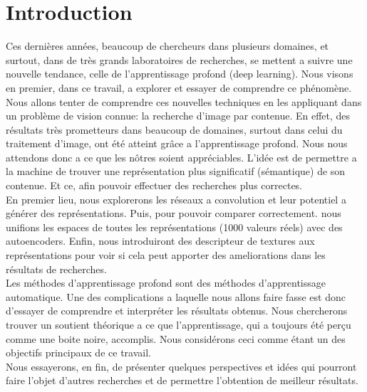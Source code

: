 
\chapter*{Introduction} %

Ces dernières années, beaucoup de chercheurs dans plusieurs domaines, et surtout, dans de très grands laboratoires de recherches, se mettent a suivre une nouvelle tendance, celle de l'apprentissage profond (deep learning). Nous visons en premier, dans ce travail, a explorer et essayer de comprendre ce phénomène.\\

Nous allons tenter de comprendre ces nouvelles techniques en les appliquant dans un problème de vision connue: la recherche d'image par contenue. En effet, des résultats très prometteurs dans beaucoup de domaines, surtout dans celui du traitement d'image, ont été atteint  grâce a l'apprentissage profond. Nous nous attendons donc a ce que les nôtres soient appréciables. L’idée est de permettre a la machine de trouver une représentation plus significatif (sémantique) de son contenue. Et ce, afin pouvoir effectuer des recherches plus correctes.\\

En premier lieu, nous explorerons les réseaux a convolution et leur potentiel a générer des représentations. Puis, pour pouvoir comparer correctement. nous unifions les espaces de toutes les représentations (1000 valeurs réels) avec des autoencoders. Enfin, nous introduiront des descripteur de textures aux représentations pour voir si cela peut apporter des ameliorations dans les résultats de recherches.\\

Les méthodes d’apprentissage profond sont des méthodes d'apprentissage automatique. Une des complications a laquelle nous allons faire fasse est donc d'essayer de comprendre et interpréter les résultats obtenus. Nous chercherons trouver un soutient théorique a ce que l'apprentissage, qui a toujours été perçu comme une boite noire, accomplis. Nous considérons ceci comme étant un des objectifs principaux de ce travail.\\

Nous essayerons, en fin, de présenter quelques perspectives et idées qui pourront faire l'objet d'autres recherches et de permettre l'obtention de meilleur résultats.

